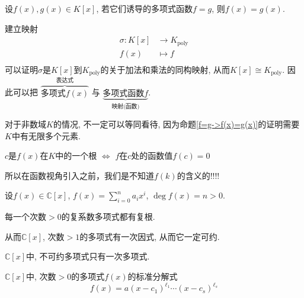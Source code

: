 \begin{Proposition} \label{f=g->f(x)=g(x)}
设$f(x), g(x) \in K[x]$, 若它们诱导的多项式函数$f = g$, 则$f(x) = g(x)$.
\end{Proposition}

\begin{Note}
建立映射
\[
\begin{aligned}
\sigma: K[x] &\rightarrow K_\text{poly} \\
f(x) & \mapsto f \\
\end{aligned}
\]
可以证明$\sigma$是$K[x]$到$K_\text{poly}$的关于加法和乘法的同构映射, 从而$K[x] \cong K_\text{poly}$. 因此可以把
$\overbrace{\text{多项式}f(x)}^{\text{表达式}}$ 与 $\underbrace{\text{多项式函数}f}_{\text{映射(函数)}}$\;.
\end{Note}

\begin{Note}
对于非数域$K$的情况, 不一定可以等同看待, 因为命题\ref{f=g->f(x)=g(x)}的证明需要$K$中有无限多个元素.
\end{Note}

\begin{Note}
$c$是$f(x)$在$K$中的一个根 $\iff$ $f$在$c$处的函数值$f(c) = 0$
\end{Note}

\begin{Note}[!!!!]
所以在函数视角引入之前，我们是不知道$f(k)$的含义的!!!!
\end{Note}

\begin{Note}
设$f(x) \in \mathbb{C}[x]$, $f(x) = \sum\limits_{i=0}^n a_i x^i$, $\deg f(x) = n > 0$.
\end{Note}

\begin{Theorem}[代数基本定理]
每一个次数$> 0$的复系数多项式都有复根. 
\end{Theorem}

\begin{Note}
从而$\mathbb{C}[x]$, 次数$> 1$的多项式有一次因式, 从而它一定可约.
\end{Note}

\begin{Corollary}
$\mathbb{C}[x]$中, 不可约多项式只有一次多项式.
\end{Corollary}

\begin{Corollary}
$\mathbb{C}[x]$中, 次数$>0$的多项式$f(x)$的标准分解式
\[
f(x) = a (x - c_1)^{\ell_1} \cdots (x - c_s)^{\ell_s} 
\]
\end{Corollary}


